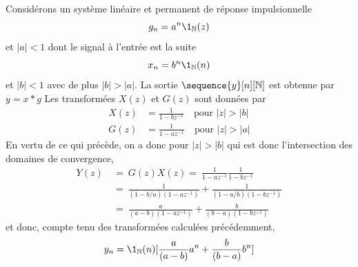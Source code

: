 Consid\'{e}rons un syst\`{e}me lin\'{e}aire et permanent de r\'{e}ponse impulsionnelle
\[
g_n=a^{n} \1_{\nset}(z)
\]
et $|a|<1$ dont le signal \`{a} l'entr\'{e}e est la suite
$$
x_n=b^{n} \1_{\nset}(n)
$$
et $|b|<1$ avec de plus $|b|>|a|$. La sortie $\sequence{y}[n][\nset]$ est obtenue par $y=x * g$ Les transform\'{e}es $X(z)$ et $G(z)$ sont donn\'{e}es par
\begin{align*}
X(z) &=  \frac{1}{1-bz^{-1}} \quad \text{pour $|z|>|b|$} \\
G(z) &=  \frac{1}{1-az^{-1}} \quad \text{pour $|z|>|a|$}
\end{align*}
En vertu de ce qui pr\'{e}c\`{e}de, on a donc pour $|z|>|b|$ qui est donc l'intersection des domaines de convergence,
\begin{align*}
Y(z)\ &=\ G(z)X(z) =\ \frac{1}{1-az^{-1}}\frac{1}{1-bz^{-1}}\\
&=\ \frac{1}{(1-b/a)(1-az^{-1})}+\frac{1}{(1-a/b)(1-bz^{-1})} \\
&=\ \frac{a}{(a-b)(1-az^{-1})}+\frac{b}{(b-a)(1-bz^{-1})}\
\end{align*}
et donc, compte tenu des transform\'{e}es calcul\'{e}es pr\'{e}c\'{e}demment,
$$
y_n=\1_\nset(n)[\frac{a}{(a-b)}a^{n}+\frac{b}{(b-a)}b^{n}]
$$
%
%
